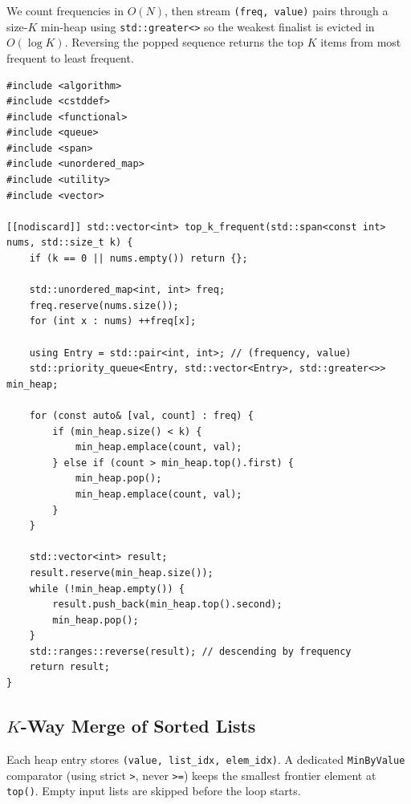 \documentclass[11pt,a4paper]{article}
\theoremstyle{definition}
\begin{document}
We count frequencies in $O(N)$, then stream \texttt{(freq, value)} pairs through a size-$K$ min-heap using \texttt{std::greater<>} so the weakest finalist is evicted in $O(\log K)$. Reversing the popped sequence returns the top $K$ items from most frequent to least frequent.

\begin{lstlisting}[caption={Top-$K$ frequent elements in $O(N + U \log K)$ time and $O(U + K)$ space.}]
#include <algorithm>
#include <cstddef>
#include <functional>
#include <queue>
#include <span>
#include <unordered_map>
#include <utility>
#include <vector>

[[nodiscard]] std::vector<int> top_k_frequent(std::span<const int> nums, std::size_t k) {
    if (k == 0 || nums.empty()) return {};

    std::unordered_map<int, int> freq;
    freq.reserve(nums.size());
    for (int x : nums) ++freq[x];

    using Entry = std::pair<int, int>; // (frequency, value)
    std::priority_queue<Entry, std::vector<Entry>, std::greater<>> min_heap;

    for (const auto& [val, count] : freq) {
        if (min_heap.size() < k) {
            min_heap.emplace(count, val);
        } else if (count > min_heap.top().first) {
            min_heap.pop();
            min_heap.emplace(count, val);
        }
    }

    std::vector<int> result;
    result.reserve(min_heap.size());
    while (!min_heap.empty()) {
        result.push_back(min_heap.top().second);
        min_heap.pop();
    }
    std::ranges::reverse(result); // descending by frequency
    return result;
}
\end{lstlisting}

\subsection{\texorpdfstring{$K$}{K}-Way Merge of Sorted Lists}

Each heap entry stores \texttt{(value, list\_idx, elem\_idx)}. A dedicated \texttt{MinByValue} comparator (using strict \texttt{>}, never \texttt{>=}) keeps the smallest frontier element at \texttt{top()}. Empty input lists are skipped before the loop starts.
\end{document}
